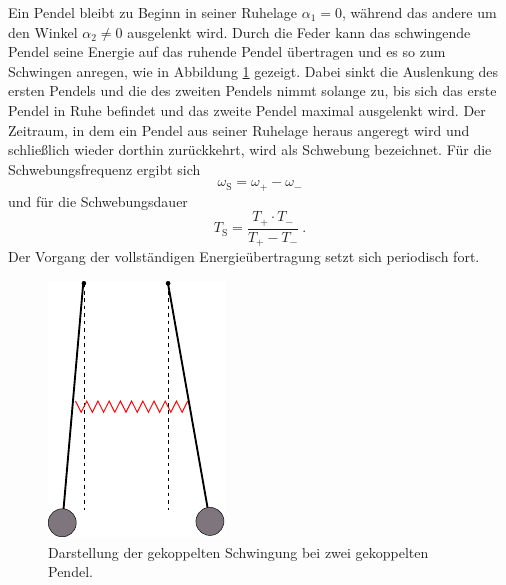     Ein Pendel bleibt zu Beginn in seiner Ruhelage $\alpha_1 = 0$,
    während das andere um den Winkel $\alpha_2 \neq 0$ ausgelenkt wird.
    Durch die Feder kann das schwingende Pendel seine Energie auf das ruhende Pendel übertragen und es so zum Schwingen anregen,
    wie in Abbildung \ref{fig:gekoppelt} gezeigt.
    Dabei sinkt die Auslenkung des ersten Pendels und die des zweiten Pendels nimmt solange zu,
    bis sich das erste Pendel in Ruhe befindet und das zweite Pendel maximal ausgelenkt wird.
    Der Zeitraum,
    in dem ein Pendel aus seiner Ruhelage heraus angeregt wird und schließlich wieder dorthin zurückkehrt,
    wird als Schwebung bezeichnet.
    Für die Schwebungsfrequenz ergibt sich
    \begin{equation}
        \omega_\text{S} = \omega_+ - \omega_-
        \label{eqn:frequenz_schwebung}
    \end{equation}
    und für die Schwebungsdauer
    \begin{equation}
        T_\text{S} = \frac{T_+ \cdot T_-}{T_+ - T_-} \ . 
        \label{eqn:dauer_schwebung}
    \end{equation}
    Der Vorgang der vollständigen Energieübertragung setzt sich periodisch fort.
    \begin{figure}
        \centering
            \includegraphics[scale=0.9]{content/img/Abb_3.pdf}
            \caption{Darstellung der gekoppelten Schwingung bei zwei gekoppelten Pendel.}
            \label{fig:gekoppelt}
    \end{figure}
